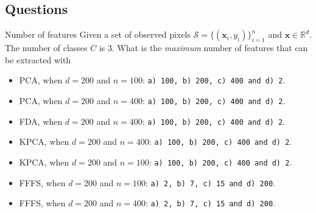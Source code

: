\documentclass[10pt,aspectratio=1610]{beamer}
\begin{document}
\subsection{Questions}
\label{sec:orgf42e34a}
\begin{frame}[fragile,label={sec:orgfffaf73}]{Number of features}
 Given         a         set         of         observed         pixels
\(\mathcal{S}=\{(\mathbf{x}_i,y_i)\}_{i=1}^n\)                       and
\(\mathbf{x}\in\mathbb{R}^{d}\). The number of classes \(C\) is \(3\).  What
is the \emph{maximum} number of features that can be extracted with

\begin{itemize}
\item <1> PCA, when \(d=200\) and \(n=100\):  \texttt{a) 100, b) 200, c) 400 and d) 2}.
\item <2> PCA, when \(d=200\) and \(n=400\): \texttt{a) 100, b) 200, c) 400 and d) 2}.
\item <3> FDA, when \(d=200\) and \(n=400\):  \texttt{a) 100, b) 200, c) 400 and d) 2}.
\item <4> KPCA, when \(d=200\) and \(n=400\):  \texttt{a) 100, b) 200, c) 400 and d) 2}.
\item <5> KPCA, when \(d=200\) and \(n=100\):  \texttt{a) 100, b) 200, c) 400 and d) 2}.
\item <6> FFFS, when \(d=200\) and \(n=100\):  \texttt{a) 2, b) 7, c) 15 and d) 200}.
\item <7> FFFS, when \(d=200\) and \(n=400\):  \texttt{a) 2, b) 7, c) 15 and d) 200}.
\end{itemize}
\end{frame}
\end{document}
